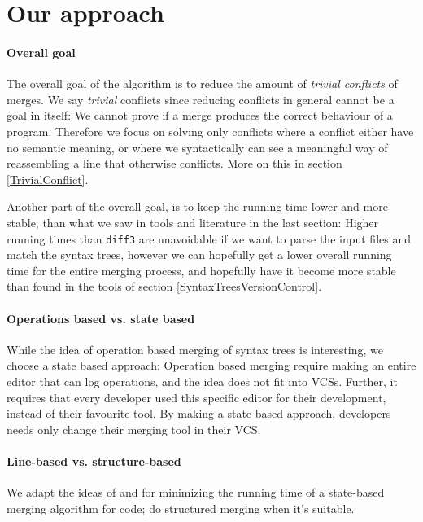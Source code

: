 \documentclass[11pt]{article}
\begin{document}
\section{Our approach}

\paragraph{Overall goal} The overall goal of the algorithm is to reduce the amount of \textit{trivial conflicts} of merges. We say \textit{trivial} conflicts since reducing conflicts in general cannot be a goal in itself: We cannot prove if a merge produces the correct behaviour of a program. Therefore we focus on solving only conflicts where a conflict either have no semantic meaning, or where we syntactically can see a meaningful way of reassembling a line that otherwise conflicts. More on this in section \ref{TrivialConflict}.

Another part of the overall goal, is to keep the running time lower and more stable, than what we saw in tools and literature in the last section: Higher running times than \texttt{diff3} are unavoidable if we want to parse the input files and match the syntax trees, however we can hopefully get a lower overall running time for the entire merging process, and hopefully have it become more stable than found in the tools of section \ref{SyntaxTreesVersionControl}.

\paragraph{Operations based vs. state based} While the idea of operation based merging of syntax trees is interesting, we choose a state based approach: Operation based merging require making an entire editor that can log operations, and the idea does not fit into VCSs. Further, it requires that every developer used this specific editor for their development, instead of their favourite tool. By making a state based approach, developers needs only change their merging tool in their VCS.

\paragraph{Line-based vs. structure-based} We adapt the ideas of \citet{Olav} and \citet{Apel} for minimizing the running time of a state-based merging algorithm for code; do structured merging when it's suitable.
\end{document}
